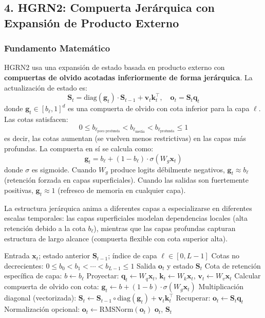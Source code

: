 \documentclass[11pt,a4paper]{article}
\begin{document}
\subsection{4. HGRN2: Compuerta Jerárquica con Expansión de Producto Externo}

\subsubsection{Fundamento Matemático}

HGRN2 \citep{qin_hgrn2_2024} usa una expansión de estado basada en producto externo con \textbf{compuertas de olvido acotadas inferiormente de forma jerárquica}. La actualización de estado es:
\[
\mathbf{S}_t = \text{diag}(\mathbf{g}_t) \cdot \mathbf{S}_{t-1} + \mathbf{v}_t \mathbf{k}_t^\top, \quad \mathbf{o}_t = \mathbf{S}_t \mathbf{q}_t
\]
donde $\mathbf{g}_t \in [b_\ell, 1]^d$ es una compuerta de olvido con cota inferior para la capa $\ell$. Las cotas satisfacen:
\[
0 \le b_{\ell_{\text{poco profunda}}} < b_{\ell_{\text{media}}} < b_{\ell_{\text{profunda}}} \le 1
\]
es decir, las cotas aumentan (se vuelven menos restrictivas) en las capas más profundas. La compuerta en sí se calcula como:
\[
\mathbf{g}_t = b_\ell + (1 - b_\ell) \cdot \sigma(W_g \mathbf{x}_t)
\]
donde $\sigma$ es sigmoide. Cuando $W_g$ produce logits débilmente negativos, $\mathbf{g}_t \approx b_\ell$ (retención forzada en capas superficiales). Cuando las salidas son fuertemente positivas, $\mathbf{g}_t \approx 1$ (refresco de memoria en cualquier capa).

La estructura jerárquica anima a diferentes capas a especializarse en diferentes escalas temporales: las capas superficiales modelan dependencias locales (alta retención debido a la cota $b_\ell$), mientras que las capas profundas capturan estructura de largo alcance (compuerta flexible con cota superior alta).

\begin{algorithm}[H]
\caption{Paso Adelante de HGRN2 con Cotas Jerárquicas}
\begin{algorithmic}[1]
\Require Entrada $\mathbf{x}_t$; estado anterior $\mathbf{S}_{t-1}$; índice de capa $\ell \in [0, L-1]$
\Require Cotas no decrecientes: $0 \le b_0 < b_1 < \cdots < b_{L-1} \le 1$
\Ensure Salida $\mathbf{o}_t$ y estado $\mathbf{S}_t$
\State Cota de retención específica de capa: $b \gets b_\ell$
\State Proyectar: $\mathbf{q}_t \gets W_q \mathbf{x}_t$, $\mathbf{k}_t \gets W_k \mathbf{x}_t$, $\mathbf{v}_t \gets W_v \mathbf{x}_t$
\State Calcular compuerta de olvido con cota: $\mathbf{g}_t \gets b + (1-b) \cdot \sigma(W_g \mathbf{x}_t)$ 
\State Multiplicación diagonal (vectorizada): $\mathbf{S}_t \gets \mathbf{S}_{t-1} \circ \text{diag}(\mathbf{g}_t) + \mathbf{v}_t \mathbf{k}_t^\top$
\State Recuperar: $\mathbf{o}_t \gets \mathbf{S}_t \mathbf{q}_t$
\State Normalización opcional: $\mathbf{o}_t \gets \text{RMSNorm}(\mathbf{o}_t)$
\Return $\mathbf{o}_t$, $\mathbf{S}_t$
\end{algorithmic}
\end{algorithm}
\end{document}

